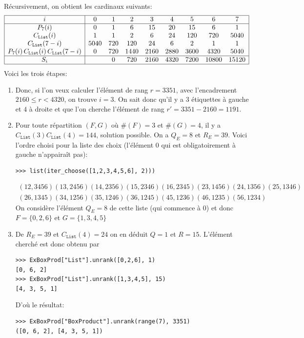 \documentclass[11pt]{article}
\begin{document}
\begin{itemize}
Récursivement, on obtient les cardinaux suivants:
\newcommand{\ttl}{\texttt{List}}
$$
\begin{array}{|c|cccccccc|}
  \hline
  i            &    0 &   1 &   2 &   3 &   4 &   5 &   6 &  7  \\
  \hline
  P_7(i)       &    0 &   1 &   6 &  15 &  20 &  15 &   6 &    1\\
  C_\ttl(i)     &    1 &   1 &   2 &   6 &  24 & 120 & 720 & 5040\\
  C_\ttl(7-i)   & 5040 & 720 & 120 &  24 &   6 &   2 &   1 &    1\\
  P_7(i)\,C_\ttl(i)\,C_\ttl(7-i)
               &    0 & 720 & 1440& 2160& 2880& 3600& 4320& 5040\\
  \hline
  S_i          &      & 0   & 720 & 2160& 4320& 7200&10800& 15120\\
  \hline
\end{array}
$$
Voici les trois étapes:
\begin{enumerate}
\item Donc, si l'on veux calculer l'élément de rang $r=3351$, avec
  l'encadrement $2160 \leq r < 4320$, on trouve $i=3$. On sait donc qu'il y a
  $3$ étiquettes à gauche et $4$ à droite et que l'on cherche l'élément de
  rang $r' = 3351 - 2160 = 1191$.
\item Pour toute répartition $(F, G)$ où $\#(F) = 3$ et $\#(G)=4$, il y a
  $C_\ttl(3)C_\ttl(4)= 144$, solution possible. On a $Q_E = 8$ et $R_E=39$.
  Voici l'ordre choisi pour la liste des choix (l'élément $0$ qui est
  obligatoirement à gauche n'appairaît pas):
\begin{verbatim}
>>> list(iter_choose([1,2,3,4,5,6], 2)))
\end{verbatim}
  \begin{gather*}
    (12,3456)(13,2456)(14,2356)(15,2346)(16,2345)(23,1456)(24,1356)(25,1346)\\
    (26,1345)(34,1256)(35,1246)(36,1245)(45,1236)(46,1235)(56,1234)
  \end{gather*}
  On considère l'élément $Q_E=8$ de cette liste (qui commence à $0$) et donc
  $F = \{0, 2, 6\}$ et $G = \{1,3,4,5\}$
\item De $R_E=39$ et $C_\ttl(4)=24$ on en déduit $Q=1$ et $R=15$. L'élément
  cherché est donc obtenu par
\begin{verbatim}
>>> ExBoxProd["List"].unrank([0,2,6], 1)
[0, 6, 2]
>>> ExBoxProd["List"].unrank([1,3,4,5], 15)
[4, 3, 5, 1]
\end{verbatim}
D'où le résultat:
\begin{verbatim}
>>> ExBoxProd["BoxProduct"].unrank(range(7), 3351)
([0, 6, 2], [4, 3, 5, 1])
\end{verbatim}
\end{enumerate}
\end{itemize}
\end{document}
